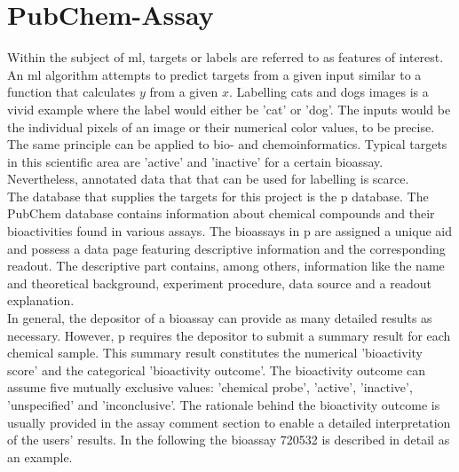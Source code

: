 \section{PubChem-Assay}\label{sec:pubchem}
Within the subject of \ac{ml}, targets or labels are referred to as features of interest. An \ac{ml} algorithm attempts to predict targets from a given input similar to a function that calculates $y$ from a given $x$. Labelling cats and dogs images is a vivid example where the label would either be 'cat' or 'dog'. The inputs would be the individual pixels of an image or their numerical color values, to be precise. The same principle can be applied to bio- and chemoinformatics. Typical targets in this scientific area are 'active' and 'inactive' for a certain bioassay. Nevertheless, annotated data that that can be used for labelling is scarce.\\
The database that supplies the targets for this project is the \acl{p} database.\cite{Kim2015} The PubChem database contains information about chemical compounds and their bioactivities found in various assays. The bioassays in \acl{p} are assigned a unique \ac{aid} and possess a data page featuring descriptive information and the corresponding readout. The descriptive part contains, among others, information like the name and theoretical background, experiment procedure, data source and a readout explanation.\cite{Wang2009}\\
In general, the depositor of a bioassay can provide as many detailed results as necessary.\cite{Wang2011} However, \acl{p} requires the depositor to submit a summary result for each chemical sample. This summary result constitutes the numerical 'bioactivity score' and the categorical 'bioactivity outcome'. The bioactivity outcome can assume five mutually exclusive values: 'chemical probe', 'active', 'inactive', 'unspecified' and 'inconclusive'. The rationale behind the bioactivity outcome is usually provided in the assay comment section to enable a detailed interpretation of the users' results.\cite{Wang2009} In the following the bioassay 720532 is described in detail as an example.\\
%
